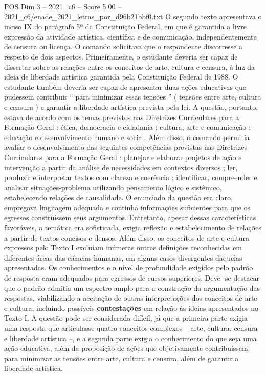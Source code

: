 \begin{textsample}{POS Dim 3 – 2021\_c6 – Score 5.00 – 2021\_c6/enade\_2021\_letras\_por\_d96b21bbf0.txt}
O segundo texto apresentava o inciso IX do parágrafo 5º da Constituição Federal, em que é garantida a livre expressão da atividade artística, científica e de comunicação, independentemente de censura ou licença.
O comando solicitava que o respondente discorresse a respeito de dois aspectos.
Primeiramente, o estudante deveria ser capaz de dissertar sobre as relações entre os conceitos de arte, cultura e censura, à luz da ideia de liberdade artística garantida pela Constituição Federal de 1988.
O estudante também deveria ser capaz de apresentar duas ações educativas que pudessem contribuir “ para minimizar essas tensões ” ( tensões entre arte, cultura e censura ) e garantir a liberdade artística prevista pela lei.
A questão, portanto, estava de acordo com os temas previstos nas Diretrizes Curriculares para a Formação Geral : ética, democracia e cidadania ; cultura, arte e comunicação ; educação e desenvolvimento humano e social.
Além disso, o comando permitia avaliar o desenvolvimento das seguintes competências previstas nas Diretrizes Curriculares para a Formação Geral : planejar e elaborar projetos de ação e intervenção a partir da análise de necessidades em contextos diversos ; ler, produzir e interpretar textos com clareza e coerência ; identificar, compreender e analisar situações-problema utilizando pensamento lógico e sistêmico, estabelecendo relações de causalidade.
O enunciado da questão era claro, empregava linguagem adequada e continha informações suficientes para que os egressos construíssem seus argumentos.
Entretanto, apesar dessas características favoráveis, a temática era sofisticada, exigia reflexão e estabelecimento de relações a partir de textos concisos e densos.
Além disso, os conceitos de arte e cultura expressos pelo Texto I excluíam inúmeras outras definições reconhecidas em diferentes áreas das ciências humanas, em alguns casos divergentes daquelas apresentadas.
Os conhecimentos e o nível de profundidade exigidos pelo padrão de resposta eram adequados para egressos de cursos superiores.
Deve -se destacar que o padrão admitia um espectro amplo para a construção da argumentação das respostas, viabilizando a aceitação de outras interpretações dos conceitos de arte e cultura, incluindo possíveis \textbf{contestações} em relação às ideias apresentados no Texto I.
A questão pode ser considerada difícil, já que a primeira parte exigia uma resposta que articulasse quatro conceitos complexos – arte, cultura, censura e liberdade artística –, e a segunda parte exigia o conhecimento do que seja uma ação educativa, além da proposição de ações que objetivamente contribuíssem para minimizar as tensões entre arte, cultura e censura, além de garantir a liberdade artística.

\end{textsample}
